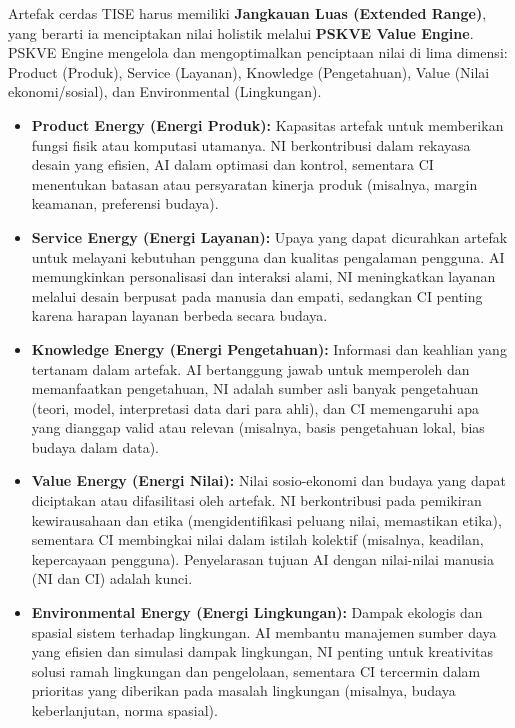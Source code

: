 \documentclass[
  letterpaper,
  DIV=11,
  numbers=noendperiod]{scrreprt}
\providecommand{\tightlist}{%
  \setlength{\itemsep}{0pt}\setlength{\parskip}{0pt}}
\begin{document}
Artefak cerdas TISE harus memiliki \textbf{Jangkauan Luas (Extended
Range)}, yang berarti ia menciptakan nilai holistik melalui
\textbf{PSKVE Value Engine}. PSKVE Engine mengelola dan mengoptimalkan
penciptaan nilai di lima dimensi: Product (Produk), Service (Layanan),
Knowledge (Pengetahuan), Value (Nilai ekonomi/sosial), dan Environmental
(Lingkungan).

\begin{itemize}
\tightlist
\item
  \textbf{Product Energy (Energi Produk):} Kapasitas artefak untuk
  memberikan fungsi fisik atau komputasi utamanya. NI berkontribusi
  dalam rekayasa desain yang efisien, AI dalam optimasi dan kontrol,
  sementara CI menentukan batasan atau persyaratan kinerja produk
  (misalnya, margin keamanan, preferensi budaya).
\item
  \textbf{Service Energy (Energi Layanan):} Upaya yang dapat dicurahkan
  artefak untuk melayani kebutuhan pengguna dan kualitas pengalaman
  pengguna. AI memungkinkan personalisasi dan interaksi alami, NI
  meningkatkan layanan melalui desain berpusat pada manusia dan empati,
  sedangkan CI penting karena harapan layanan berbeda secara budaya.
\item
  \textbf{Knowledge Energy (Energi Pengetahuan):} Informasi dan keahlian
  yang tertanam dalam artefak. AI bertanggung jawab untuk memperoleh dan
  memanfaatkan pengetahuan, NI adalah sumber asli banyak pengetahuan
  (teori, model, interpretasi data dari para ahli), dan CI memengaruhi
  apa yang dianggap valid atau relevan (misalnya, basis pengetahuan
  lokal, bias budaya dalam data).
\item
  \textbf{Value Energy (Energi Nilai):} Nilai sosio-ekonomi dan budaya
  yang dapat diciptakan atau difasilitasi oleh artefak. NI berkontribusi
  pada pemikiran kewirausahaan dan etika (mengidentifikasi peluang
  nilai, memastikan etika), sementara CI membingkai nilai dalam istilah
  kolektif (misalnya, keadilan, kepercayaan pengguna). Penyelarasan
  tujuan AI dengan nilai-nilai manusia (NI dan CI) adalah kunci.
\item
  \textbf{Environmental Energy (Energi Lingkungan):} Dampak ekologis dan
  spasial sistem terhadap lingkungan. AI membantu manajemen sumber daya
  yang efisien dan simulasi dampak lingkungan, NI penting untuk
  kreativitas solusi ramah lingkungan dan pengelolaan, sementara CI
  tercermin dalam prioritas yang diberikan pada masalah lingkungan
  (misalnya, budaya keberlanjutan, norma spasial).
\end{itemize}
\end{document}
